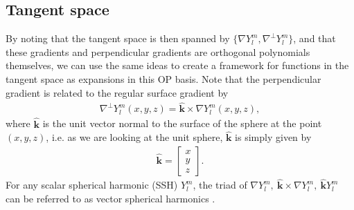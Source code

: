 \documentclass[11pt, oneside]{article}   	%
\newcommand{\Ylm}{Y^m_l}
\newcommand{\bigP}{\mathbb{P}}
\newcommand{\gradYlm}{\nabla Y^m_l}
\newcommand{\gradpYlm}{\nabla^\perp Y^m_l}
\newcommand{\unitvec}{\hat{\bm{k}}}
\begin{document}
%

\subsection{Tangent space}

By noting that the tangent space is then spanned by $\{\gradYlm, \gradpYlm\}$, and that these gradients and perpendicular gradients are orthogonal polynomials themselves, we can use the same ideas to create a framework for functions in the tangent space as expansions in this OP basis. Note that the perpendicular gradient is related to the regular surface gradient by
\begin{align}
\gradpYlm(x,y,z) = \unitvec \times \gradYlm(x,y,z),
\end{align}
where \(\unitvec\) is the unit vector normal to the surface of the sphere at the point \((x,y,z)\), i.e. as we are looking at the unit sphere, \(\unitvec\) is simply given by
\begin{align}
\unitvec = \begin{bmatrix} x \\ y \\ z \end{bmatrix}.
\end{align}
For any scalar spherical harmonic (SSH) $\Ylm$, the triad of $\gradYlm, \: \unitvec \times \gradYlm, \: \unitvec \Ylm$ can be referred to as vector spherical harmonics \cite{barrera1985vector}.
\end{document}
